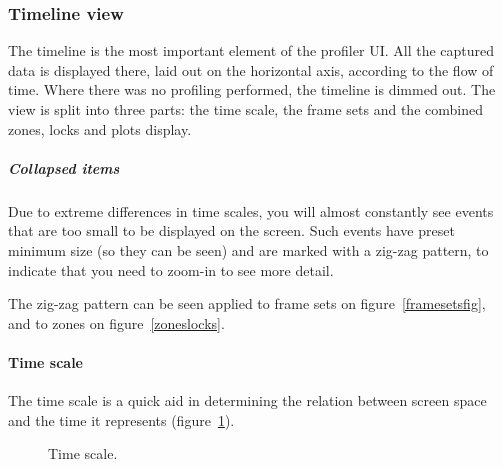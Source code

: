 \documentclass[hidelinks,titlepage,a4paper]{article}
\begin{document}
\subsubsection{Timeline view}

The timeline is the most important element of the profiler UI. All the captured data is displayed there, laid out on the horizontal axis, according to the flow of time. Where there was no profiling performed, the timeline is dimmed out. The view is split into three parts: the time scale, the frame sets and the combined zones, locks and plots display.

\subparagraph{Collapsed items}
\label{collapseditems}

Due to extreme differences in time scales, you will almost constantly see events that are too small to be displayed on the screen. Such events have preset minimum size (so they can be seen) and are marked with a zig-zag pattern, to indicate that you need to zoom-in to see more detail.

The zig-zag pattern can be seen applied to frame sets on figure~\ref{framesetsfig}, and to zones on figure~\ref{zoneslocks}.

\paragraph{Time scale}

The time scale is a quick aid in determining the relation between screen space and the time it represents (figure~\ref{timescale}).

\begin{figure}[h]
\centering{}
\caption{Time scale.}
\label{timescale}
\end{figure}
\end{document}

